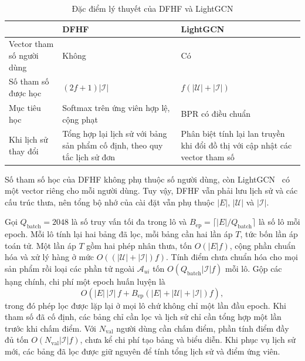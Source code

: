 \begin{table}[H]
\centering
\small
\begin{tabularx}{\textwidth}{@{}p{3cm}>{\raggedright\arraybackslash}X>{\raggedright\arraybackslash}X@{}}
\toprule
 & DFHF & LightGCN \\
\midrule
Vector tham số người dùng & Không & Có \\
Số tham số được học & $(2f+1)|\mathcal{I}|$ & $f(|\mathcal{U}|+|\mathcal{I}|)$ \\
Mục tiêu học & Softmax trên ứng viên hợp lệ, cộng phạt & BPR có điều chuẩn \\
Khi lịch sử thay đổi & Tổng hợp lại lịch sử với bảng sản phẩm cố định, theo quy tắc lịch sử đơn & Phân biệt tính lại lan truyền khi đổi đồ thị với cập nhật các vector tham số \\
\bottomrule
\end{tabularx}
\caption{Đặc điểm lý thuyết của DFHF và LightGCN}
\label{tab:complexity-trained}
\end{table}

Số tham số học của DFHF không phụ thuộc số người dùng, còn LightGCN~\cite{he2020lightgcn} có một vector riêng cho mỗi người dùng. Tuy vậy, DFHF vẫn phải lưu lịch sử và các cấu trúc thưa, nên tổng bộ nhớ của cài đặt vẫn phụ thuộc $|E|$, $|\mathcal{U}|$ và $|\mathcal{I}|$.

Gọi $Q_{\mathrm{batch}}=2048$ là số truy vấn tối đa trong lô và $B_{\mathrm{ep}}=\lceil |E|/Q_{\mathrm{batch}}\rceil$ là số lô mỗi epoch. Mỗi lô tính lại hai bảng đã lọc, mỗi bảng cần hai lần áp $T$, tức bốn lần áp toán tử. Một lần áp $T$ gồm hai phép nhân thưa, tốn $O(|E|f)$, cộng phần chuẩn hóa và xử lý hàng ở mức $O((|\mathcal{U}|+|\mathcal{I}|)f)$. Tính điểm chưa chuẩn hóa cho mọi sản phẩm rồi loại các phần tử ngoài $\mathcal{A}_{ui}$ tốn $O(Q_{\mathrm{batch}}|\mathcal{I}|f)$ mỗi lô. Gộp các hạng chính, chi phí một epoch huấn luyện là
\begin{equation}
O\!\left(|E|\,|\mathcal{I}|\,f
+B_{\mathrm{ep}}(|E|+|\mathcal{U}|+|\mathcal{I}|)f\right),
\label{eq:dfhf-epoch-cost}
\end{equation}
trong đó phép lọc được lặp lại ở mọi lô chứ không chỉ một lần đầu epoch. Khi tham số đã cố định, các bảng chỉ cần lọc và lịch sử chỉ cần tổng hợp một lần trước khi chấm điểm. Với $N_{\mathrm{val}}$ người dùng cần chấm điểm, phần tính điểm đầy đủ tốn $O(N_{\mathrm{val}}|\mathcal{I}|f)$, chưa kể chi phí tạo bảng và biểu diễn. Khi phục vụ lịch sử mới, các bảng đã lọc được giữ nguyên để tính tổng lịch sử và điểm ứng viên.
